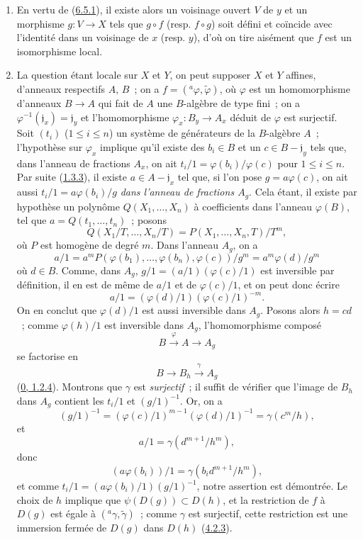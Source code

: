 \begin{enumerate}
  \item[(ii)] En vertu de (\hyperref[I.6.5.1-fr]{6.5.1}), il existe alors un
    voisinage ouvert $V$ de $y$ et un morphisme $g:V\to X$ tels que $g\circ f$
    (resp. $f\circ g$) soit défini et coïncide avec l'identité dans un
    voisinage de $x$ (resp. $y$), d'où on tire aisément que $f$ est un
    isomorphisme local.
  \item[(i)] La question étant locale sur $X$ et $Y$, on peut supposer $X$ et
    $Y$ affines, d'anneaux respectifs $A$, $B$~; on a
    $f=({}^a\varphi,\widetilde{\varphi})$, où $\varphi$ est un homomorphisme
    d'anneaux $B\to A$ qui fait de $A$ une $B$-algèbre de type fini~; on a
    $\varphi^{-1}(\mathfrak{j}_x)=\mathfrak{j}_y$ et l'homomorphisme
    $\varphi_x:B_y\to A_x$ déduit de $\varphi$ est surjectif. Soit $(t_i)$
    ($1\leq i\leq n$) un système de générateurs de la $B$-algèbre $A$~;
    l'hypothèse sur $\varphi_x$ implique qu'il existe des $b_i\in B$ et un
    $c\in B-\mathfrak{j}_y$ tels que, dans l'anneau de fractions $A_x$, on ait
    $t_i/1=\varphi(b_i)/\varphi(c)$ pour $1\leq i\leq n$. Par suite
    (\hyperref[I.1.3.3-fr]{1.3.3}), il existe $a\in A-\mathfrak{j}_x$ tel que,
    si l'on pose $g=a\varphi(c)$, on ait aussi
    $t_i/1=a\varphi(b_i)/g$ \emph{dans l'anneau de fractions $A_g$}. Cela étant,
    il existe par hypothèse un polynôme $Q(X_1,\ldots,X_n)$ à coefficients dans
    l'anneau $\varphi(B)$,
    tel que $a=Q(t_1,\ldots,t_n)$~; posons
    \[
      Q(X_1/T,\ldots,X_n/T)
      =P(X_1,\ldots,X_n,T)/T^m,
    \]
    où $P$ est homogène de degré $m$. Dans l'anneau $A_g$, on a
    \[
      a/1
      =a^mP(\varphi(b_1),\ldots,\varphi(b_n),\varphi(c))/g^m
      =a^m\varphi(d)/g^m
    \]
    où $d\in B$. Comme, dans $A_g$,
    $g/1=(a/1)(\varphi(c)/1)$ est inversible par définition, il en est de même
    de $a/1$ et de $\varphi(c)/1$, et on peut donc écrire
    \[
      a/1=(\varphi(d)/1)(\varphi(c)/1)^{-m}.
    \]
    On en conclut que $\varphi(d)/1$ est aussi inversible dans $A_g$. Posons
    alors $h=cd$~; comme $\varphi(h)/1$ est inversible dans $A_g$,
    l'homomorphisme composé
    \[
      B\xrightarrow{\varphi}A\longrightarrow A_g
    \]
    se factorise en
    \[
      B\longrightarrow B_h\xrightarrow{\gamma}A_g
    \]
    (\hyperref[0.1.2.4-fr]{0, 1.2.4}). Montrons que $\gamma$ est
    \emph{surjectif}~; il suffit de vérifier que l'image de $B_h$ dans $A_g$
    contient les $t_i/1$ et $(g/1)^{-1}$. Or, on a
    \[
      (g/1)^{-1}
      =(\varphi(c)/1)^{m-1}(\varphi(d)/1)^{-1}
      =\gamma(c^m/h),
    \]
    et
    \[
      a/1=\gamma(d^{m+1}/h^m),
    \]
    donc
    \[
      (a\varphi(b_i))/1=\gamma(b_i d^{m+1}/h^m),
    \]
    et comme
    $t_i/1=(a\varphi(b_i)/1)(g/1)^{-1}$, notre assertion est démontrée. Le
    choix de $h$ implique que $\psi(D(g))\subset D(h)$, et la restriction de
    $f$ à $D(g)$ est égale à
    $({}^a\gamma,\widetilde{\gamma})$~; comme $\gamma$ est surjectif, cette
    restriction est une immersion fermée de $D(g)$ dans $D(h)$
    (\hyperref[I.4.2.3-fr]{4.2.3}).
\end{enumerate}

